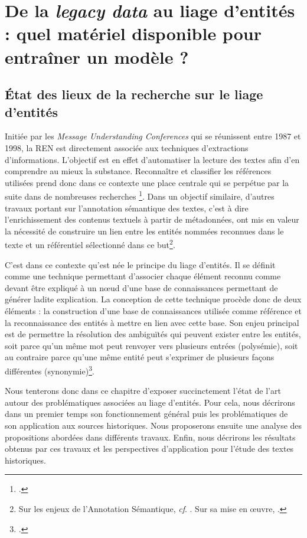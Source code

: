 \documentclass[a4paper,12pt,twoside]{book}
\begin{document}
	\part{De la \textit{legacy data} au liage d'entités : quel matériel disponible pour entraîner un modèle ?}
	
	\chapter{État des lieux de la recherche sur le liage d'entités}
	
	Initiée par les \textit{Message Understanding Conferences} qui se réunissent entre 1987 et 1998, la REN est directement associée aux techniques d'extractions d'informations. L'objectif est en effet d'automatiser la lecture des textes afin d'en comprendre au mieux la substance. Reconnaître et classifier les références utilisées prend donc dans ce contexte une place centrale qui se perpétue par la suite dans de nombreuses recherches \footcite[p. 17--19]{ehrmann_les_2008}. Dans un objectif similaire, d'autres travaux portant sur l'annotation sémantique des textes, c'est à dire l'enrichissement des contenus textuels à partir de métadonnées, ont mis en valeur la nécessité de construire un lien entre les entités nommées reconnues dans le texte et un référentiel sélectionné dans ce but\footnote{Sur les enjeux de l'Annotation Sémantique, \textit{cf}. \cite[p. 15--16]{stern_identification_2013}. Sur sa mise en œuvre, \cite[p. 96--99]{stern_identification_2013}.}.
	
	C'est dans ce contexte qu'est née le principe du liage d'entités. Il se définit comme une technique permettant d'associer chaque élément reconnu comme devant être expliqué à un nœud d'une base de connaissances permettant de générer ladite explication. La conception de cette technique procède donc de deux éléments : la construction d'une base de connaissances utilisée comme référence et la reconnaissance des entités à mettre en lien avec cette base. Son enjeu principal est de permettre la résolution des ambiguïtés qui peuvent exister entre les entités, soit parce qu'un même mot peut renvoyer vers plusieurs entrées (polysémie), soit au contraire parce qu'une même entité peut s'exprimer de plusieurs façons différentes (synonymie)\footcite[p. 110--114]{stern_identification_2013}.
	
	Nous tenterons donc dans ce chapitre d'exposer succinctement l'état de l'art autour des  problématiques associées au liage d'entités. Pour cela, nous décrirons dans un premier temps son fonctionnement général puis les problématiques de son application aux sources historiques. Nous proposerons ensuite une analyse des propositions abordées dans différents travaux. Enfin, nous décrirons les résultats obtenus par ces travaux et les perspectives d'application pour l'étude des textes historiques.
	
\end{document}

